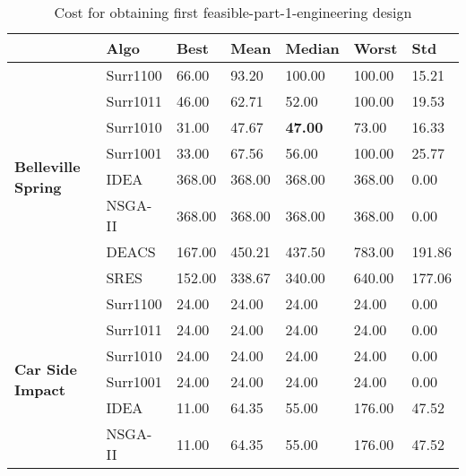 \begin{table*}[!htb]\scriptsize
	\caption{Cost for obtaining first feasible-part-1-engineering design}
	\label{tab:firstfeascoste1}
	\centering
	\begin{tabular}{lllllll}
		\specialrule{.2em}{.1em}{.1em} 
		\multicolumn{1}{l}{\textbf{Problems}}       & \multicolumn{1}{l}{\textbf{Algo}} & \multicolumn{1}{l}{\textbf{Best}} & \multicolumn{1}{l}{\textbf{Mean}} & \multicolumn{1}{l}{\textbf{Median}} & \multicolumn{1}{l}{\textbf{Worst}} & \textbf{Std} \\ \hline																					
		\multirow{8}{*}{\textbf{Belleville Spring}} & Surr1100      & 66.00         & 93.20         & 100.00          & 100.00         & 15.21        \\  
		& Surr1011      & 46.00         & 62.71         & 52.00           & 100.00         & 19.53        \\  
		& Surr1010      & 31.00         & 47.67         & \textbf{47.00}  & 73.00          & 16.33        \\  
		& Surr1001      & 33.00         & 67.56         & 56.00           & 100.00         & 25.77        \\  
		& IDEA          & 368.00        & 368.00        & 368.00          & 368.00         & 0.00         \\  
		& NSGA-II       & 368.00        & 368.00        & 368.00          & 368.00         & 0.00         \\  
		& DEACS         & 167.00        & 450.21        & 437.50          & 783.00         & 191.86       \\  
		& SRES          & 152.00        & 338.67        & 340.00          & 640.00         & 177.06       \\ \hline
		\multirow{8}{*}{\textbf{Car Side Impact}}   & Surr1100      & 24.00         & 24.00         & 24.00           & 24.00          & 0.00         \\  
		& Surr1011      & 24.00         & 24.00         & 24.00           & 24.00          & 0.00         \\  
		& Surr1010      & 24.00         & 24.00         & 24.00           & 24.00          & 0.00         \\  
		& Surr1001      & 24.00         & 24.00         & 24.00           & 24.00          & 0.00         \\
		& IDEA          & 11.00         & 64.35         & 55.00           & 176.00         & 47.52        \\  
		& NSGA-II       & 11.00         & 64.35         & 55.00           & 176.00         & 47.52        \\  

\end{tabular}
\end{table*}
